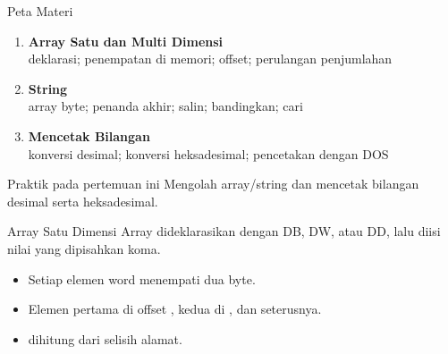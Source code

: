 \documentclass[aspectratio=169,11pt]{beamer}
\begin{document}
\begin{frame}{Peta Materi}
\small
\begin{enumerate}
    \item \textbf{Array Satu dan Multi Dimensi}\\
          {\footnotesize deklarasi; penempatan di memori; offset;
          perulangan penjumlahan}

    \vspace{0.25em}
    \item \textbf{String}\\
          {\footnotesize array byte; penanda akhir; salin;
          bandingkan; cari}

    \vspace{0.25em}
    \item \textbf{Mencetak Bilangan}\\
          {\footnotesize konversi desimal; konversi heksadesimal;
          pencetakan dengan DOS}
\end{enumerate}

\vspace{0.35em}
\begin{block}{Praktik pada pertemuan ini}
\small Mengolah array/string dan mencetak bilangan desimal serta
heksadesimal.
\end{block}
\end{frame}


\begin{frame}[fragile]{Array Satu Dimensi}
\small
Array dideklarasikan dengan DB, DW, atau DD, lalu diisi nilai yang
dipisahkan koma.

\vspace{0.2em}

\vspace{0.15em}
\begin{itemize}
    \item Setiap elemen word menempati dua byte.
    \item Elemen pertama di offset , kedua di
          , dan seterusnya.
    \item {} dihitung dari selisih alamat.
\end{itemize}
\end{frame}
\end{document}
